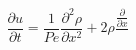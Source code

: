 \documentclass{article}
\newcommand{\pd}[2]{\frac{\partial{#1}}{\partial{#2}}}
\newcommand{\pdd}[2]{\frac{\partial^2{#1}}{\partial{#2}^2}}
\begin{document}
\[\pd u t = \frac{1}{Pe} \pdd \rho x + 2\rho \frac{\frac{\partial }{\partial x} }{}\]
\end{document}
